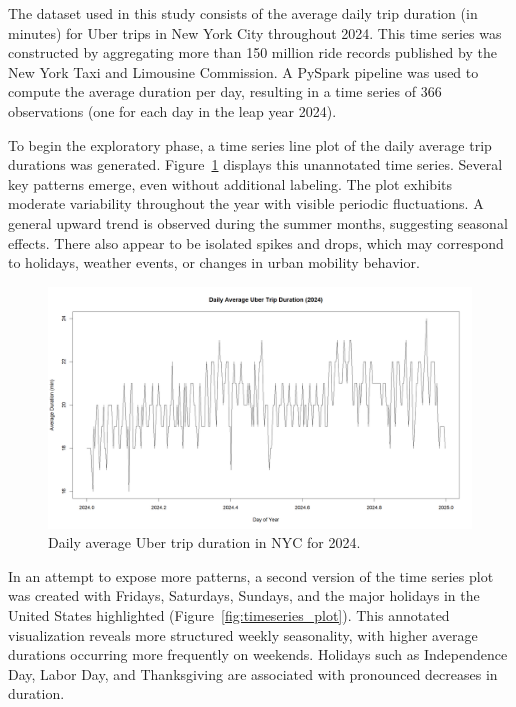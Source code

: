 \documentclass{article}
\begin{document}
The dataset used in this study consists of the average daily trip duration (in minutes) for Uber trips in New York City throughout 2024. This time series was constructed by aggregating more than 150 million ride records published by the New York Taxi and Limousine Commission. A PySpark pipeline was used to compute the average duration per day, resulting in a time series of 366 observations (one for each day in the leap year 2024).


To begin the exploratory phase, a time series line plot of the daily average trip durations was generated. Figure~\ref{fig:initial_plot} displays this unannotated time series. Several key patterns emerge, even without additional labeling. The plot exhibits moderate variability throughout the year with visible periodic fluctuations. A general upward trend is observed during the summer months, suggesting seasonal effects. There also appear to be isolated spikes and drops, which may correspond to holidays, weather events, or changes in urban mobility behavior.

\begin{figure}
  \centering
  \includegraphics[width=\textwidth]{avg_trip_duration_simple.png}
  \caption{Daily average Uber trip duration in NYC for 2024.}
  \label{fig:initial_plot}
\end{figure}

In an attempt to expose more patterns, a second version of the time series plot was created with Fridays, Saturdays, Sundays, and the major holidays in the United States highlighted (Figure~\ref{fig:timeseries_plot}). This annotated visualization reveals more structured weekly seasonality, with higher average durations occurring more frequently on weekends. Holidays such as Independence Day, Labor Day, and Thanksgiving are associated with pronounced decreases in duration.
\end{document}
